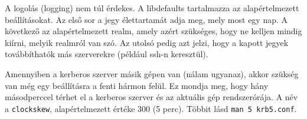 
A logolás (logging) nem túl érdekes. A libdefaults tartalmazza az alapértelmezett beállításokat. Az első sor a jegy
élettartamát adja meg, mely most egy nap. A következő az alapértelmezett realm, amely azért szükséges, hogy ne kelljen
mindig kiírni, melyik realmról van szó. Az utolsó pedig azt jelzi, hogy a kapott jegyek továbbíthatók más szerverekre
(például ssh-n keresztül).

Amennyiben a kerberos szerver másik gépen van (nálam ugyanaz), akkor szükség van még egy beállításra a fenti hármon
felül. Ez mondja meg, hogy hány másodperccel térhet el a kerberos szerver és az aktuális gép rendszerórája. A név a
\texttt{clockskew}, alapértelmezett értéke 300 (5 perc). Többit lásd \texttt{man 5 krb5.conf}.

